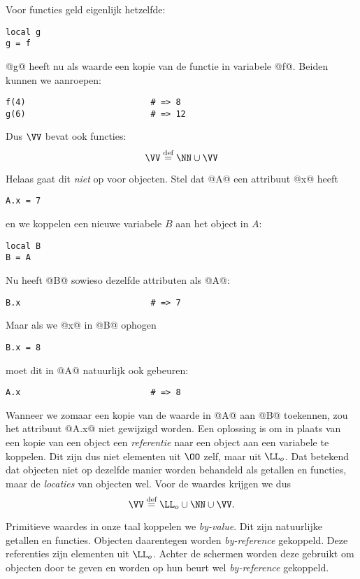 Voor functies geld eigenlijk hetzelfde:
\begin{lstlisting}
local g
g = f
\end{lstlisting}
@g@ heeft nu als waarde een kopie van de functie in variabele @f@. Beiden kunnen we aanroepen:
\begin{lstlisting}
f(4)                         # => 8
g(6)                         # => 12
\end{lstlisting}
Dus $\VV$ bevat ook functies:
\begin{equation*}
  \VV \DEF \NN \cup \VV
\end{equation*}

Helaas gaat dit \emph{niet} op voor objecten. Stel dat @A@ een attribuut @x@ heeft
\begin{lstlisting}
A.x = 7
\end{lstlisting}
en we koppelen een nieuwe variabele $B$ aan het object in $A$:
\begin{lstlisting}
local B
B = A
\end{lstlisting}
Nu heeft @B@ sowieso dezelfde attributen als @A@:
\begin{lstlisting}
B.x                          # => 7
\end{lstlisting}
Maar als we @x@ in @B@ ophogen
\begin{lstlisting}
B.x = 8
\end{lstlisting}
moet dit in @A@ natuurlijk ook gebeuren:
\begin{lstlisting}
A.x                          # => 8
\end{lstlisting}
Wanneer we zomaar een kopie van de waarde in @A@ aan @B@ toekennen, zou het attribuut @A.x@ niet gewijzigd worden. Een oplossing is om in plaats van een kopie van een object een \emph{referentie} naar een object aan een variabele te koppelen. Dit zijn dus niet elementen uit $\OO$ zelf, maar uit $\LL_o$. Dat betekend dat objecten niet op dezelfde manier worden behandeld als getallen en functies, maar de \emph{locaties} van objecten wel. Voor de waardes krijgen we dus
\begin{equation*}
  \VV \DEF \LL_o \cup \NN \cup \VV.
\end{equation*}

Primitieve waardes in onze taal koppelen we \emph{by-value}. Dit zijn natuurlijke getallen en functies. Objecten daarentegen worden \emph{by-reference} gekoppeld. Deze referenties zijn elementen uit $\LL_o$. Achter de schermen worden deze gebruikt om objecten door te geven en worden op hun beurt wel \emph{by-reference} gekoppeld.

